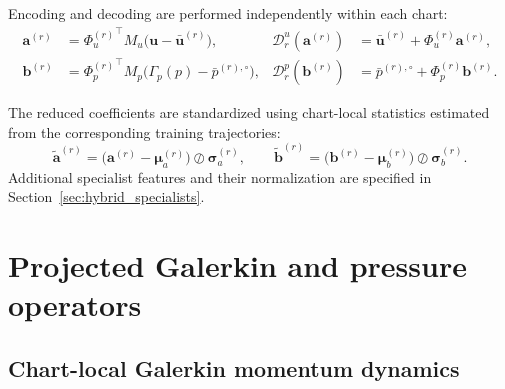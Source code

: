 Encoding and decoding are performed independently within each chart:
\begin{align}
    \bm a^{(r)}
    &=
    {\Phi_u^{(r)}}^\top
    M_u
    \bigl(\bm u-\bar{\bm u}^{(r)}\bigr),
    &
    \mathcal D_r^u(\bm a^{(r)})
    &=
    \bar{\bm u}^{(r)}
    +\Phi_u^{(r)}\bm a^{(r)},
    \\
    \bm b^{(r)}
    &=
    {\Phi_p^{(r)}}^\top
    M_p
    \bigl(\Gamma_p(p)-\bar p^{(r),\circ}\bigr),
    &
    \mathcal D_r^p(\bm b^{(r)})
    &=
    \bar p^{(r),\circ}
    +\Phi_p^{(r)}\bm b^{(r)}.
    \label{eq:app_encode_decode}
\end{align}

The reduced coefficients are standardized using chart-local statistics estimated from the corresponding training trajectories:
\begin{equation}
    \widetilde{\bm a}^{(r)}
    =
    \bigl(
        \bm a^{(r)}-\bm\mu_a^{(r)}
    \bigr)
    \oslash
    \bm\sigma_a^{(r)},
    \qquad
    \widetilde{\bm b}^{(r)}
    =
    \bigl(
        \bm b^{(r)}-\bm\mu_b^{(r)}
    \bigr)
    \oslash
    \bm\sigma_b^{(r)}.
    \label{eq:app_local_scalers}
\end{equation}
Additional specialist features and their normalization are specified in Section~\ref{sec:hybrid_specialists}.








\section{Projected Galerkin and pressure operators}
\label{app:rom}

\subsection{Chart-local Galerkin momentum dynamics}

